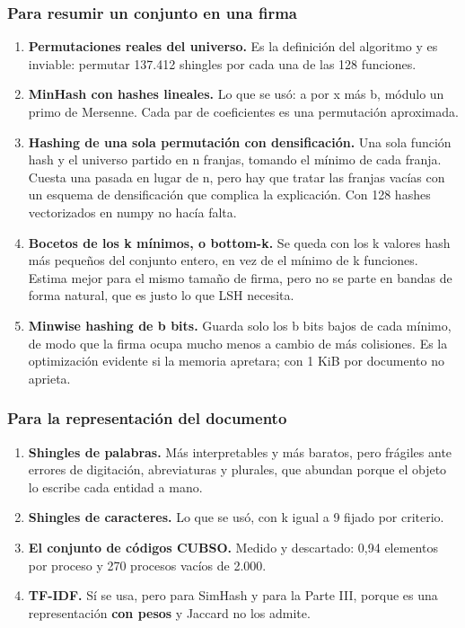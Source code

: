 \documentclass[11pt]{article}
\begin{document}
\subsubsection*{Para resumir un conjunto en una firma}
\begin{enumerate}
  \item \textbf{Permutaciones reales del universo.} Es la definición del algoritmo y es inviable: permutar 137.412 shingles por cada una de las 128 funciones.
  \item \textbf{MinHash con hashes lineales.} Lo que se usó: a por x más b, módulo un primo de Mersenne. Cada par de coeficientes es una permutación aproximada.
  \item \textbf{Hashing de una sola permutación con densificación.} Una sola función hash y el universo partido en n franjas, tomando el mínimo de cada franja. Cuesta una pasada en lugar de n, pero hay que tratar las franjas vacías con un esquema de densificación que complica la explicación. Con 128 hashes vectorizados en numpy no hacía falta.
  \item \textbf{Bocetos de los k mínimos, o bottom-k.} Se queda con los k valores hash más pequeños del conjunto entero, en vez de el mínimo de k funciones. Estima mejor para el mismo tamaño de firma, pero no se parte en bandas de forma natural, que es justo lo que LSH necesita.
  \item \textbf{Minwise hashing de b bits.} Guarda solo los b bits bajos de cada mínimo, de modo que la firma ocupa mucho menos a cambio de más colisiones. Es la optimización evidente si la memoria apretara; con 1 KiB por documento no aprieta.
\end{enumerate}
\subsubsection*{Para la representación del documento}
\begin{enumerate}
  \item \textbf{Shingles de palabras.} Más interpretables y más baratos, pero frágiles ante errores de digitación, abreviaturas y plurales, que abundan porque el objeto lo escribe cada entidad a mano.
  \item \textbf{Shingles de caracteres.} Lo que se usó, con k igual a 9 fijado por criterio.
  \item \textbf{El conjunto de códigos CUBSO.} Medido y descartado: 0,94 elementos por proceso y 270 procesos vacíos de 2.000.
  \item \textbf{TF-IDF.} Sí se usa, pero para SimHash y para la Parte III, porque es una representación \textbf{con pesos} y Jaccard no los admite.
\end{enumerate}
\end{document}
